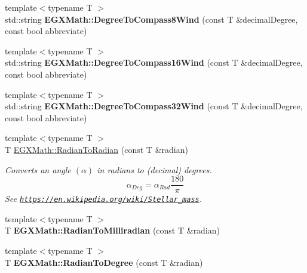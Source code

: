 \begin{DoxyCompactItemize}
{\footnotesize template$<$typename T $>$ }\\std\+::string {\bfseries E\+G\+X\+Math\+::\+Degree\+To\+Compass8\+Wind} (const T \&decimal\+Degree, const bool abbreviate)
\item 
\mbox{\label{group___e_g_x_math-_angle_conversions_ga426e45c519f51eda3b0707077899b396}} 
{\footnotesize template$<$typename T $>$ }\\std\+::string {\bfseries E\+G\+X\+Math\+::\+Degree\+To\+Compass16\+Wind} (const T \&decimal\+Degree, const bool abbreviate)
\item 
\mbox{\label{group___e_g_x_math-_angle_conversions_gaace99e59924f53bcbbc1c12cefee25e7}} 
{\footnotesize template$<$typename T $>$ }\\std\+::string {\bfseries E\+G\+X\+Math\+::\+Degree\+To\+Compass32\+Wind} (const T \&decimal\+Degree, const bool abbreviate)
\item 
{\footnotesize template$<$typename T $>$ }\\T \mbox{\hyperlink{group___e_g_x_math-_angle_conversions_gae08681bd86b8e7e4325f6c8cb3a0dc37}{E\+G\+X\+Math\+::\+Radian\+To\+Radian}} (const T \&radian)
\begin{DoxyCompactList}\small\item\em Converts an angle $(\alpha)$ in radians to (decimal) degrees. \[\alpha_{Deg}=\alpha_{Rad}\frac{180}{\pi}\] See \href{https://en.wikipedia.org/wiki/Stellar_mass}{\tt https\+://en.\+wikipedia.\+org/wiki/\+Stellar\+\_\+mass}. \end{DoxyCompactList}\item 
\mbox{\label{group___e_g_x_math-_angle_conversions_gaea391f0cca39b05e298dd1cae162e7f1}} 
{\footnotesize template$<$typename T $>$ }\\T {\bfseries E\+G\+X\+Math\+::\+Radian\+To\+Milliradian} (const T \&radian)
\item 
\mbox{\label{group___e_g_x_math-_angle_conversions_ga25bbce6cdc1c3621f2a158d320e3bc45}} 
{\footnotesize template$<$typename T $>$ }\\T {\bfseries E\+G\+X\+Math\+::\+Radian\+To\+Degree} (const T \&radian)
\item 
\mbox{\label{group___e_g_x_math-_angle_conversions_ga6d170f1882c32de53167c04524d05f67}} 

\end{DoxyCompactItemize}
